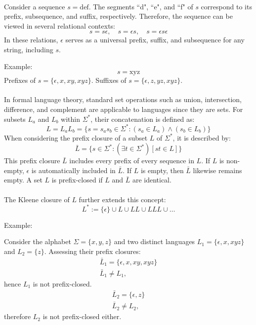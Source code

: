 \paragraph{} Consider a sequence \(s = \text{def}\). The segments ``d", ``e", and ``f" of \(s\) correspond to its prefix, subsequence, and suffix, respectively. Therefore, the sequence can be viewed in several relational contexts:
\[
s = s \epsilon, \quad s = \epsilon s, \quad s = \epsilon s \epsilon
\]
In these relations, \(\epsilon\) serves as a universal prefix, suffix, and subsequence for any string, including \(s\).

\noindent 
Example:
\[
s = \text{xyz}
\]
Prefixes of \(s = \{\epsilon, x, xy, xyz\}\). Suffixes of \(s = \{\epsilon, z, yz, xyz\}\).

\paragraph{} In formal language theory, standard set operations such as union, intersection, difference, and complement are applicable to languages since they are sets. For subsets \(L_a\) and \(L_b\) within \(\Sigma^*\), their concatenation is defined as:
\[
L = L_a L_b = \{s = s_a s_b \in \Sigma^* : (s_a \in L_a) \wedge (s_b \in L_b)\}
\]
When considering the prefix closure of a subset \(L\) of \(\Sigma^*\), it is described by:
\[
\bar{L} = \{s \in \Sigma^* : (\exists t \in \Sigma^*)[st \in L]\}
\]
This prefix closure \(\bar{L}\) includes every prefix of every sequence in \(L\). If \(L\) is non-empty, \(\epsilon\) is automatically included in \(\bar{L}\). If \(L\) is empty, then \(\bar{L}\) likewise remains empty. A set \(L\) is prefix-closed if \(L\) and \(\bar{L}\) are identical.

\paragraph{} The Kleene closure of \(L\) further extends this concept:
\[
L^* := \{\epsilon\} \cup L \cup LL \cup LLL \cup \ldots
\]

\noindent
Example:

Consider the alphabet \(\Sigma = \{x, y, z\}\) and two distinct languages \(L_1 = \{\epsilon, x, xyz\}\) and \(L_2 = \{z\}\). Assessing their prefix closures:
\[
\begin{gathered}
\bar{L}_1 = \{\epsilon, x, xy, xyz\} \\
\bar{L}_1 \neq L_1,
\end{gathered}
\]
hence \(L_1\) is not prefix-closed.
\[
\begin{gathered}
\bar{L}_2 = \{\epsilon, z\} \\
\bar{L}_2 \neq L_2,
\end{gathered}
\]
therefore \(L_2\) is not prefix-closed either.


